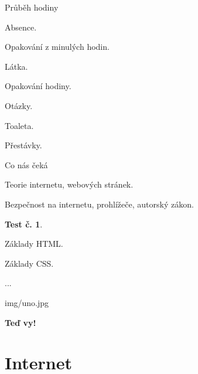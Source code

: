 \documentclass[aspectratio=169]{beamer}
\begin{document}
\begin{frame}{Průběh hodiny}
    \begin{cardTiny}
        \begin{flushleft}
            Absence.

            Opakování z minulých hodin.

            Látka.

            Opakování hodiny.
        \end{flushleft}
    \end{cardTiny}
    \begin{cardTiny}
        \begin{flushleft}
            Otázky.

            Toaleta.

            Přestávky.
        \end{flushleft}
    \end{cardTiny}
\end{frame}

\begin{frame}{Co nás čeká}
    \begin{cardTiny}
        \begin{flushleft}
            Teorie internetu, webových stránek.

            Bezpečnost na internetu, prohlížeče, autorský zákon.
            
            \textbf{Test č. 1}.

            Základy HTML.

            Základy CSS.

            ...
        \end{flushleft}
    \end{cardTiny}
\end{frame}

\begin{frameImg}[width]{img/uno.jpg}
    \vspace*{60mm}
    \begin{cardTiny}
        \vspace*{\fill}
        \begin{center}
            \textbf{Teď vy!}
        \end{center}
    \end{cardTiny}
\end{frameImg}


\section{Internet}
\end{document}
